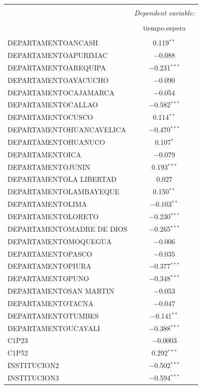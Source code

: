 \documentclass{article}
\begin{document}
\begin{tabular}{@{\extracolsep{5pt}}lc}
\\[-1.8ex]\hline
\hline \\[-1.8ex]
 & \multicolumn{1}{c}{\textit{Dependent variable:}} \\
\cline{2-2}
\\[-1.8ex] & tiempo.espera \\
\hline \\[-1.8ex]
 DEPARTAMENTOANCASH & 0.119$^{**}$ \\
 DEPARTAMENTOAPURIMAC & $-$0.088 \\
 DEPARTAMENTOAREQUIPA & $-$0.231$^{***}$ \\
 DEPARTAMENTOAYACUCHO & $-$0.090 \\
 DEPARTAMENTOCAJAMARCA & $-$0.054 \\
 DEPARTAMENTOCALLAO & $-$0.582$^{***}$ \\
 DEPARTAMENTOCUSCO & 0.114$^{**}$ \\
 DEPARTAMENTOHUANCAVELICA & $-$0.470$^{***}$ \\
 DEPARTAMENTOHUANUCO & 0.107$^{*}$ \\
 DEPARTAMENTOICA & $-$0.079 \\
 DEPARTAMENTOJUNIN & 0.193$^{***}$ \\
 DEPARTAMENTOLA LIBERTAD & 0.027 \\
 DEPARTAMENTOLAMBAYEQUE & 0.150$^{**}$ \\
 DEPARTAMENTOLIMA & $-$0.103$^{**}$ \\
 DEPARTAMENTOLORETO & $-$0.230$^{***}$ \\
 DEPARTAMENTOMADRE DE DIOS & $-$0.265$^{***}$ \\
 DEPARTAMENTOMOQUEGUA & $-$0.006 \\
 DEPARTAMENTOPASCO & $-$0.035 \\
 DEPARTAMENTOPIURA & $-$0.377$^{***}$ \\
 DEPARTAMENTOPUNO & $-$0.348$^{***}$ \\
 DEPARTAMENTOSAN MARTIN & $-$0.053 \\
 DEPARTAMENTOTACNA & $-$0.047 \\
 DEPARTAMENTOTUMBES & $-$0.141$^{**}$ \\
 DEPARTAMENTOUCAYALI & $-$0.388$^{***}$ \\
 C1P23 & $-$0.0003 \\
 C1P52 & 0.292$^{***}$ \\
 INSTITUCION2 & $-$0.502$^{***}$ \\
 INSTITUCION3 & $-$0.594$^{***}$ \\

\end{tabular}
\end{document}
